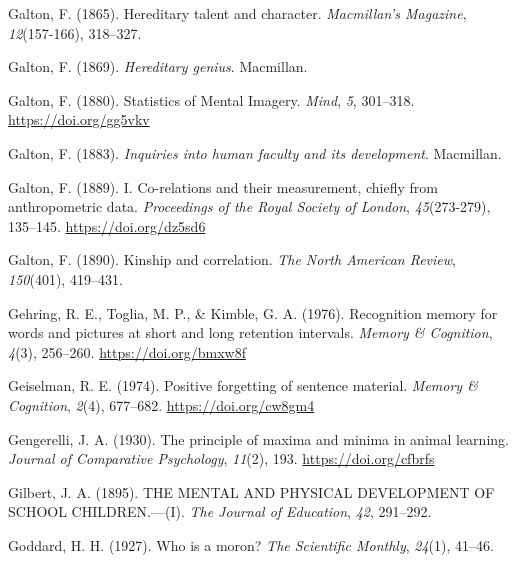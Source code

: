 \documentclass[
  oneside,
  12pt]{crumpbook}
\newlength{\cslhangindent}
\newlength{\cslentryspacingunit} %
\newenvironment{CSLReferences}[2] %
 {%
  \setlength{\parindent}{0pt}
  \ifodd #1
  \let\oldpar\par
  \def\par{\hangindent=\cslhangindent\oldpar}
  \fi
  \setlength{\parskip}{#2\cslentryspacingunit}
 }%
 {}
\begin{document}
\begin{CSLReferences}{1}{0}
\leavevmode{}%
Galton, F. (1865). Hereditary talent and character. \emph{Macmillan's Magazine}, \emph{12}(157-166), 318--327.

\leavevmode{}%
Galton, F. (1869). \emph{Hereditary genius}. {Macmillan}.

\leavevmode{}%
Galton, F. (1880). Statistics of {Mental Imagery}. \emph{Mind}, \emph{5}, 301--318. \url{https://doi.org/gg5vkv}

\leavevmode{}%
Galton, F. (1883). \emph{Inquiries into human faculty and its development}. {Macmillan}.

\leavevmode{}%
Galton, F. (1889). I. {Co}-relations and their measurement, chiefly from anthropometric data. \emph{Proceedings of the Royal Society of London}, \emph{45}(273-279), 135--145. \url{https://doi.org/dz5sd6}

\leavevmode{}%
Galton, F. (1890). Kinship and correlation. \emph{The North American Review}, \emph{150}(401), 419--431.

\leavevmode{}%
Gehring, R. E., Toglia, M. P., \& Kimble, G. A. (1976). Recognition memory for words and pictures at short and long retention intervals. \emph{Memory \& Cognition}, \emph{4}(3), 256--260. \url{https://doi.org/bmxw8f}

\leavevmode{}%
Geiselman, R. E. (1974). Positive forgetting of sentence material. \emph{Memory \& Cognition}, \emph{2}(4), 677--682. \url{https://doi.org/cw8gm4}

\leavevmode{}%
Gengerelli, J. A. (1930). The principle of maxima and minima in animal learning. \emph{Journal of Comparative Psychology}, \emph{11}(2), 193. \url{https://doi.org/cfbrfs}

\leavevmode{}%
Gilbert, J. A. (1895). {THE MENTAL AND PHYSICAL DEVELOPMENT OF SCHOOL CHILDREN}.---({I}). \emph{The Journal of Education}, \emph{42}, 291--292.

\leavevmode{}%
Goddard, H. H. (1927). Who is a moron? \emph{The Scientific Monthly}, \emph{24}(1), 41--46.


\end{CSLReferences}
\end{document}
